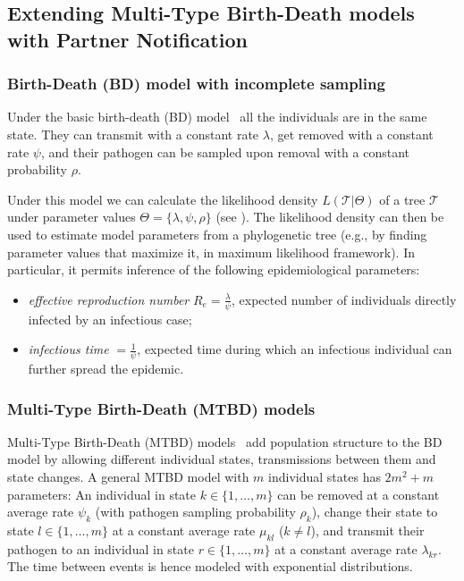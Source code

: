 \documentclass[10pt,letterpaper]{article}
\begin{document}
\subsection*{Extending Multi-Type Birth-Death models with Partner Notification}
\subsubsection*{Birth-Death (BD) model with incomplete sampling}
Under the basic birth-death (BD) model~\cite{Stadler2009} all the individuals are in the same state. They can transmit with a constant rate $\lambda$, get removed with a constant rate $\psi$, and their pathogen can be sampled upon removal with a constant probability $\rho$. 

Under this model we can calculate the likelihood density $L(\mathscr{T}|\Theta)$ of a tree $\mathscr{T}$ under parameter values $\Theta = \{\lambda, \psi, \rho\}$ (see ). The likelihood density can then be used to estimate model parameters from a phylogenetic tree (e.g., by finding parameter values that maximize it, in maximum likelihood framework). In particular, it permits inference of the following epidemiological parameters: 

\begin{itemize}
\item \textit{effective reproduction number} $R_e = \frac{\lambda}{\psi}$, expected number of individuals directly infected by an infectious case;
\item \textit{infectious time} $=\frac{1}{\psi}$, expected time during which an infectious individual can further spread the epidemic.
\end{itemize} 



\subsubsection*{Multi-Type Birth-Death (MTBD) models}
Multi-Type Birth-Death (MTBD) models~\cite{Stadler2013a} add population structure to the BD model by allowing different individual states, transmissions between them and state changes. A general MTBD model with $m$ individual states has $2m^2 + m$ parameters: An individual in state $k \in \{1, \ldots, m\}$ can be removed at a constant average rate $\psi_k$ (with pathogen sampling probability $\rho_k$), change their state to state $l \in \{1, \ldots, m\}$ at a constant average rate $\mu_{kl}$ ($k \neq l$), and transmit their pathogen to an individual in state $r \in \{1, \ldots, m\} $ at a constant average rate $\lambda_{kr}$. The time between events %
is hence modeled with exponential distributions.
\end{document}
